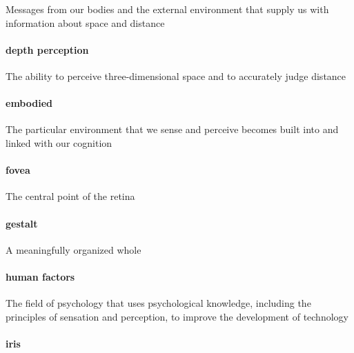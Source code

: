 \documentclass[
]{krantz}
\begin{document}
Messages from our bodies and the external environment that supply us with information about space and distance

\hypertarget{depth-perception}{%
\paragraph*{depth perception}\label{depth-perception}}

The ability to perceive three-dimensional space and to accurately judge distance

\hypertarget{embodied}{%
\paragraph*{embodied}\label{embodied}}

The particular environment that we sense and perceive becomes built into and linked with our cognition

\hypertarget{fovea}{%
\paragraph*{fovea}\label{fovea}}

The central point of the retina

\hypertarget{gestalt}{%
\paragraph*{gestalt}\label{gestalt}}

A meaningfully organized whole

\hypertarget{human-factors}{%
\paragraph*{human factors}\label{human-factors}}

The field of psychology that uses psychological knowledge, including the principles of sensation and perception, to improve the development of technology

\hypertarget{iris}{%
\paragraph*{iris}\label{iris}}
\end{document}
